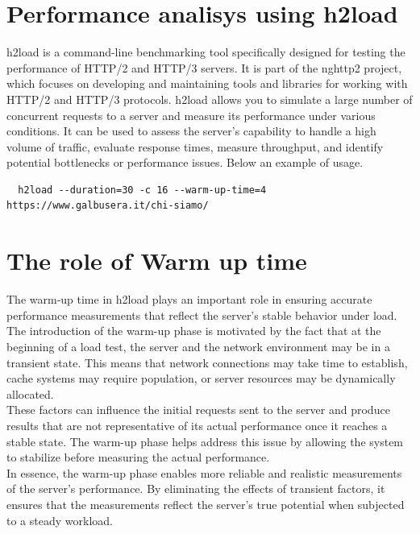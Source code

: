 \documentclass[eng]{class}
\begin{document}
\section{Performance analisys using h2load}

h2load is a command-line benchmarking tool specifically designed for testing the performance of HTTP/2 and HTTP/3 servers.
It is part of the nghttp2 project, which focuses on developing and maintaining tools and libraries for working with HTTP/2 and HTTP/3 protocols.
h2load allows you to simulate a large number of concurrent requests to a server and measure its performance under various conditions.
It can be used to assess the server's capability to handle a high volume of traffic, evaluate response times, measure throughput,
and identify potential bottlenecks or performance issues.
Below an example of usage.
\begin{lstlisting}
  h2load --duration=30 -c 16 --warm-up-time=4  https://www.galbusera.it/chi-siamo/
\end{lstlisting}

\section{The role of Warm up time}
The warm-up time in h2load plays an important role in ensuring accurate performance measurements that reflect the server's stable behavior under load.\\
The introduction of the warm-up phase is motivated by the fact that at the beginning of a load test, the server and the network environment may be in a transient state. 
This means that network connections may take time to establish, cache systems may require population, or server resources may be dynamically allocated.\\
These factors can influence the initial requests sent to the server and produce results that are not representative of 
its actual performance once it reaches a stable state. 
The warm-up phase helps address this issue by allowing the system to stabilize before measuring the actual performance.\\
In essence, the warm-up phase enables more reliable and realistic measurements of the server's performance. 
By eliminating the effects of transient factors, it ensures that the measurements reflect the server's true potential when subjected to a steady workload.
\end{document}
